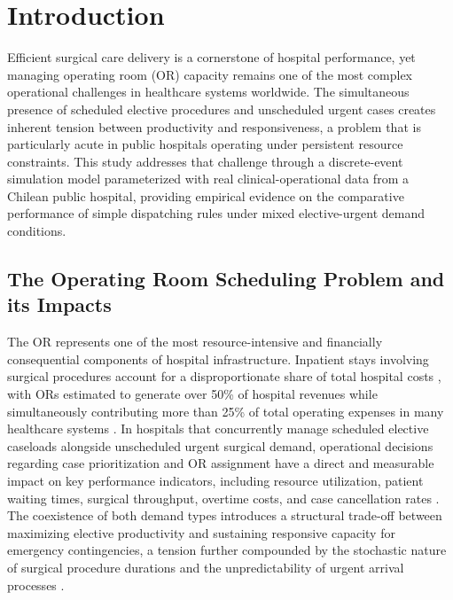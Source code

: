 \documentclass[sn-mathphys-num]{sn-jnl}
\begin{document}
\section{Introduction}\label{sec:intro}

Efficient surgical care delivery is a cornerstone of hospital performance,
yet managing operating room (OR) capacity remains one of the most complex
operational challenges in healthcare systems worldwide. The simultaneous
presence of scheduled elective procedures and unscheduled urgent cases
creates inherent tension between productivity and responsiveness, a problem
that is particularly acute in public hospitals operating under persistent
resource constraints. This study addresses that challenge through a
discrete-event simulation model parameterized with real clinical-operational
data from a Chilean public hospital, providing empirical evidence on the
comparative performance of simple dispatching rules under mixed elective-urgent
demand conditions.

\subsection{The Operating Room Scheduling Problem and its Impacts}

The OR represents one of the most resource-intensive and
financially consequential components of hospital infrastructure. Inpatient
stays involving surgical procedures account for a disproportionate share of
total hospital costs \cite{mcdermott2021overview}, with ORs estimated to generate
over 50\% of hospital revenues while simultaneously contributing more than
25\% of total operating expenses in many healthcare systems \cite{macario2010does}.
In hospitals that concurrently manage scheduled elective caseloads alongside
unscheduled urgent surgical demand, operational decisions regarding case
prioritization and OR assignment have a direct and measurable impact on key
performance indicators, including resource utilization, patient waiting times,
surgical throughput, overtime costs, and case cancellation rates
\cite{may2011surgical,lamiri2008stochastic}. The coexistence of both demand types introduces a
structural trade-off between maximizing elective productivity and sustaining
responsive capacity for emergency contingencies, a tension further compounded
by the stochastic nature of surgical procedure durations and the
unpredictability of urgent arrival processes \cite{gerchak1996reservation,may2011surgical}.
\end{document}
